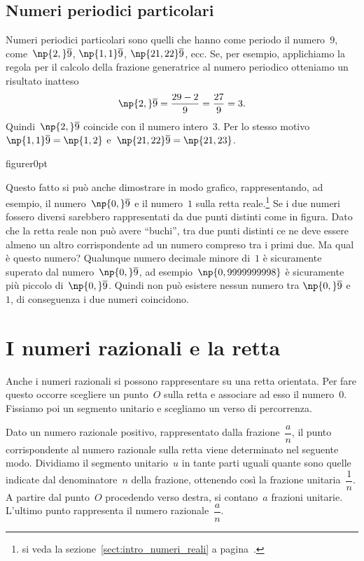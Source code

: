 \subsection{Numeri periodici particolari}

Numeri periodici particolari sono quelli che hanno come periodo il numero~$9$,
come~$\np{2,}\overline{9}$, $\np{1,1}\overline{9}$, $\np{21,22}\overline{9}$, ecc.
Se, per esempio, applichiamo la regola per il calcolo della frazione generatrice al numero periodico
otteniamo un risultato inatteso
\[\np{2,}\overline{9}=\frac{29-2}{9}=\frac{27}{9}=3.\]
Quindi~$\np{2,}\overline{9}$ coincide con il numero intero~$3$.
Per lo stesso motivo~$\np{1,1}\overline{9}=\np{1,2}$ e~$\np{21,22}\overline{9}=\np{21,23}$.

\begin{wrapfloat}{figure}{r}{0pt}

\end{wrapfloat}

Questo fatto si può anche dimostrare in modo grafico, rappresentando, ad esempio, il numero~$\np{0,}\overline{9}$ e
il numero~$1$ sulla retta reale.\footnote{si veda la sezione~\ref{sect:intro_numeri_reali} a pagina~\pageref{sect:intro_numeri_reali}.}
Se i due numeri fossero diversi sarebbero rappresentati da due punti distinti
come in figura. Dato che la retta reale non può avere ``buchi'',
tra due punti distinti ce ne deve essere almeno un altro corrispondente ad un numero compreso tra i primi due.
Ma qual è questo numero? Qualunque numero decimale minore di~$1$ è sicuramente superato dal numero~$\np{0,}\overline{9}$,
ad esempio~$\np{0,9999999998}$ è sicuramente più piccolo di~$\np{0,}\overline{9}$. Quindi non può esistere nessun numero tra
$\np{0,}\overline{9}$ e~$1$,
di conseguenza i due numeri coincidono.

\ovalbox{\risolvii \ref{ese:3.27}, \ref{ese:3.28}, \ref{ese:3.29}, \ref{ese:3.30}, \ref{ese:3.31}, \ref{ese:3.32}}

\section{I numeri razionali e la retta}

Anche i numeri razionali si possono rappresentare su una retta orientata. Per fare questo occorre
scegliere un punto~$O$ sulla retta e associare ad esso il numero~0. Fissiamo poi un segmento unitario e scegliamo
un verso di percorrenza.

Dato un numero razionale positivo, rappresentato dalla frazione~$\dfrac{a}{n}$, il punto corrispondente al numero
razionale sulla retta viene determinato nel seguente modo. Dividiamo il segmento unitario~$u$ in tante parti uguali
quante sono quelle indicate dal denominatore~$n$ della frazione, ottenendo così la frazione unitaria~$\dfrac{1}{n}$.
A partire dal punto~$O$ procedendo verso destra, si contano~$a$ frazioni unitarie.
L'ultimo punto rappresenta il numero razionale~$\dfrac{a}{n}$.

